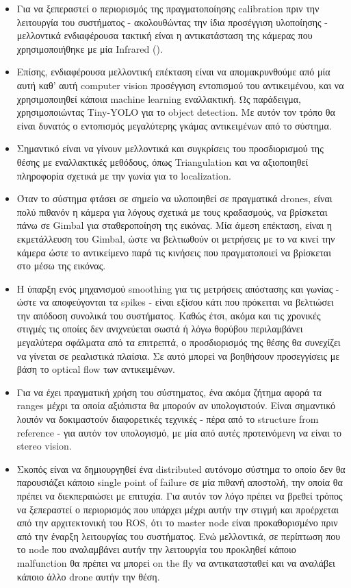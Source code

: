 \begin{itemize}
    \item Για να ξεπεραστεί ο περιορισμός της πραγματοποίησης calibration πριν την λειτουργία του συστήματος - ακολουθώντας την ίδια προσέγγιση υ\-λο\-ποίη\-σης - μελλοντικά ενδιαφέρουσα τακτική είναι η αντικατάσταση της κάμερας που χρησιμοποιήθηκε με μία Infrared ().
    \item Επίσης, ενδιαφέρουσα μελλοντική επέκταση είναι να απομακρυνθούμε από μία αυτή καθ' αυτή computer vision προσέγγιση εντοπισμού του αντικειμένου, και να χρησιμοποιηθεί κάποια machine learning εναλλακτική. Ως παράδειγμα, χρησιμοποιώντας Tiny-YOLO για το object detection. Με αυτόν τον τρόπο θα είναι δυνατός ο εντοπισμός μεγαλύτερης γκάμας αντικειμένων από το σύστημα.
    \item Σημαντικό είναι να γίνουν μελλοντικά και συγκρίσεις του προσδιορισμού της θέσης με εναλλακτικές μεθόδους, όπως Triangulation και να αξιοποιηθεί πληροφορία σχετικά με την γωνία για το localization.
    \item Όταν το σύστημα φτάσει σε σημείο να υλοποιηθεί σε πραγματικά drones, είναι πολύ πιθανόν η κάμερα για λόγους σχετικά με τους κραδασμούς, να βρίσκεται πάνω σε Gimbal για σταθεροποίηση της εικόνας. Μία άμεση επέκταση, είναι η εκμετάλλευση του Gimbal, ώστε να βελτιωθούν οι μετρήσεις με το να κινεί την κάμερα ώστε το αντικείμενο παρά τις κινήσεις που πραγματοποιεί να βρίσκεται στο μέσω της εικόνας.
    \item Η ύπαρξη ενός μηχανισμού smoothing για τις μετρήσεις απόστασης και γωνίας - ώστε να αποφεύγονται τα spikes - είναι εξίσου κάτι που πρόκειται να βελτιώσει την απόδοση συνολικά του συστήματος. Καθώς έτσι, ακόμα και τις χρονικές στιγμές τις οποίες δεν ανιχνεύεται σωστά ή λόγω θορύβου περιλαμβάνει με\-γα\-λύ\-τε\-ρα σφάλματα από τα επιτρεπτά, ο προσδιορισμός της θέσης θα συνεχίζει να γίνεται σε ρεαλιστικά πλαίσια. Σε αυτό μπορεί να βοηθήσουν προσεγγίσεις με βάση το optical flow των αντικειμένων.
    \item Για να έχει πραγματική χρήση του σύστηματος, ένα ακόμα ζήτημα αφορά τα ranges μέχρι τα οποία αξιόπιστα θα μπορούν αν υπολογιστούν. Eίναι σημαντικό λοιπόν να δοκιμαστούν διαφορετικές τεχνικές - πέρα από το structure from reference - για αυτόν τον υπολογισμό, με μία από αυτές
    προτεινόμενη να είναι το stereo vision.
    \item Σκοπός είναι να δημιουργηθεί ένα distributed αυτόνομο σύστημα το οποίο δεν θα παρουσιάζει κάποιο single point of failure σε μία πιθανή αποστολή, την οποία θα πρέπει να διεκπεραιώσει με επιτυχία. Για αυτόν τον λόγο πρέπει να βρεθεί τρόπος να ξεπεραστεί ο περιορισμός που υπάρχει μέχρι αυτήν την στιγμή και προέρχεται από την αρχιτεκτονική του ROS, ότι το master node είναι προκαθορισμένο πριν από την έναρξη λειτουργίας του συστήματος. Ενώ μελλοντικά, σε περίπτωση που το node που αναλαμβάνει αυτήν την λειτουργία του προκληθεί κάποιο malfunction θα πρέπει να μπορεί on the fly να αντικατασταθεί και να αναλάβει κάποιο άλλο drone αυτήν την θέση.

\end{itemize}
